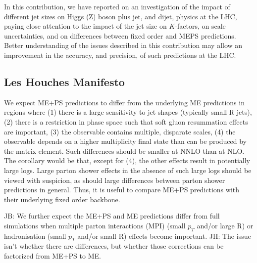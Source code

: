\documentclass[aps,prd,onecolumn,fleqn,superscriptaddress,groupedaddress,nofootinbib,preprintnumbers,nobalancelastpage]{revtex4}
\begin{document}
In this contribution, we have reported on an investigation of the impact of
different jet sizes on Higgs (Z)  boson plus jet, and dijet, physics at the LHC, paying close
attention to the impact of the jet size on $K$-factors, on scale uncertainties,
and on differences between fixed order and MEPS predictions. Better
understanding of the issues described in this contribution may allow an
improvement in the accuracy, and precision,  of such predictions at the LHC.

\subsection{Les Houches Manifesto}

We expect ME+PS predictions to differ from the underlying ME predictions in regions where (1) there is a large sensitivity to jet shapes (typically small R jets), (2) there is a restriction in phase space such that soft gluon resummation effects are important, (3) the observable contains multiple, disparate  scales, (4) the observable depends on a higher multiplicity final state than can be produced by the matrix element. Such differences should be smaller at NNLO than at NLO. The corollary would be that, except for (4), the other effects result in 
potentially large logs. Large parton shower effects in the absence of such large logs should be viewed with suspicion, as should large differences between parton shower predictions in general. Thus, it is useful to compare ME+PS predictions with their underlying fixed order backbone. 

JB: We further expect the ME+PS and ME predictions differ from full simulations when multiple parton interactions (MPI) (small $p_T$ and/or large R) or hadronisation  (small $p_T$ and/or small R) effects become important. 
JH: The issue isn't whether there are differences, but whether those corrections can be factorized from ME+PS to ME. 



\end{document}
